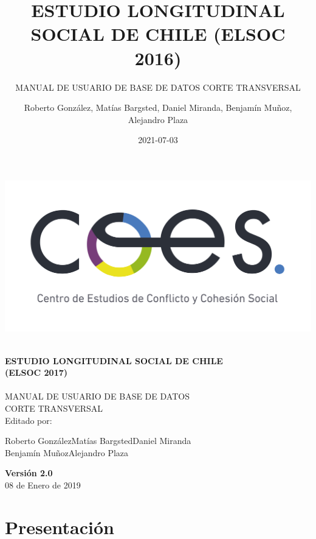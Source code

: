 \documentclass[
]{book}
\title{ESTUDIO LONGITUDINAL SOCIAL DE CHILE (ELSOC 2016)}
\subtitle{MANUAL DE USUARIO DE BASE DE DATOS CORTE TRANSVERSAL}
\author{Roberto González, Matías Bargsted, Daniel Miranda, Benjamín Muñoz, Alejandro Plaza}
\date{2021-07-03}
\begin{document}
\maketitle


\begin{titlepage}
	\centering
	\includegraphics[width=16cm]{coes_blanco_esp.jpg}

\HRule{1.4pt} \\
\LARGE \textbf{\uppercase{Estudio Longitudinal Social de Chile}}\\
\LARGE \textbf{\uppercase{(ELSOC 2017)}}\\

\HRule{1.4pt} \\ [0.2cm]

\normalsize  \vspace*{0.2\baselineskip}
 \large \textsc{MANUAL DE USUARIO DE BASE DE DATOS\\ 	CORTE TRANSVERSAL}
\\ [0.2cm]
\vspace*{0.9cm}
Editado por:\\
\begin{center}
Roberto González\hspace*{1.25cm}Matías Bargsted\hspace*{1.25cm}Daniel Miranda\\
Benjamín Muñoz\hspace*{1.5cm}Alejandro Plaza\\
\end{center}
\vspace*{1.3cm}
\textbf{Versión 2.0}\\
08 de Enero de  2019\\
\end{titlepage}

{
\setcounter{tocdepth}{1}
\tableofcontents
}
\hypertarget{present}{%
\chapter{Presentación}\label{present}}
\end{document}
